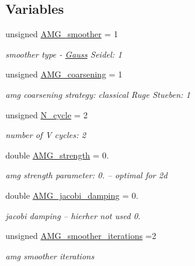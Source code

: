 \subsection*{Variables}
\begin{DoxyCompactItemize}
\item 
unsigned \hyperlink{namespaceoomph_1_1Biharmonic__schur__complement__Hypre__defaults_ab6c010a72ca50be6be38ea9bd5b44207}{A\+M\+G\+\_\+smoother} = 1
\begin{DoxyCompactList}\small\item\em smoother type -\/ \hyperlink{classoomph_1_1Gauss}{Gauss} Seidel\+: 1 \end{DoxyCompactList}\item 
unsigned \hyperlink{namespaceoomph_1_1Biharmonic__schur__complement__Hypre__defaults_ad2bc859a57f88c9e48b7bada12072a53}{A\+M\+G\+\_\+coarsening} = 1
\begin{DoxyCompactList}\small\item\em amg coarsening strategy\+: classical Ruge Stueben\+: 1 \end{DoxyCompactList}\item 
unsigned \hyperlink{namespaceoomph_1_1Biharmonic__schur__complement__Hypre__defaults_a551840dd4e8b9965373a34d4812737bf}{N\+\_\+cycle} = 2
\begin{DoxyCompactList}\small\item\em number of V cycles\+: 2 \end{DoxyCompactList}\item 
double \hyperlink{namespaceoomph_1_1Biharmonic__schur__complement__Hypre__defaults_add427c041f6e292957a23376feb5bb89}{A\+M\+G\+\_\+strength} = 0.
\begin{DoxyCompactList}\small\item\em amg strength parameter\+: 0. -- optimal for 2d \end{DoxyCompactList}\item 
double \hyperlink{namespaceoomph_1_1Biharmonic__schur__complement__Hypre__defaults_a88ea130601c20b76b2895c48803d2be5}{A\+M\+G\+\_\+jacobi\+\_\+damping} = 0.
\begin{DoxyCompactList}\small\item\em jacobi damping -- hierher not used 0. \end{DoxyCompactList}\item 
unsigned \hyperlink{namespaceoomph_1_1Biharmonic__schur__complement__Hypre__defaults_af1e2bbd2c7203fe3166489c111f3b166}{A\+M\+G\+\_\+smoother\+\_\+iterations} =2
\begin{DoxyCompactList}\small\item\em amg smoother iterations \end{DoxyCompactList}\end{DoxyCompactItemize}


